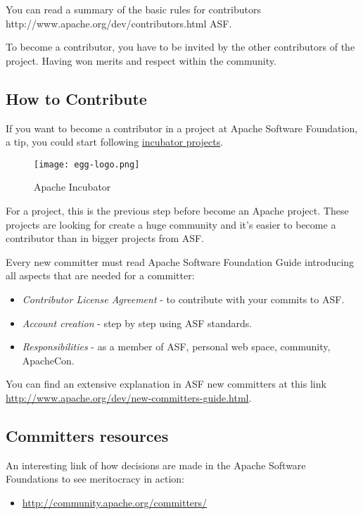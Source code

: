 \par You can read a summary of the basic rules for contributors http://www.apache.org/dev/contributors.html ASF.

\par To become a contributor, you have to be invited by the other contributors of the project. Having won merits and respect within the community.

\subsection{How to Contribute}

\par If you want to become a contributor in a project at Apache Software Foundation, a tip, you could start following \href{http://incubator.apache.org/}{incubator projects}.

\begin{figure}[htp]
    \centering
    \texttt{[image: egg-logo.png]}
    \caption{Apache Incubator}
    \label{egg-logo}
\end{figure}

\par For a project, this is the previous step before become an Apache project. These projects are looking for create a huge community and it's easier to become a contributor than in bigger projects from ASF.

\par Every new committer must read Apache Software Foundation Guide introducing all aspects that are needed for a committer:

\begin{itemize}
	\item \textit{Contributor License Agreement} - to contribute with your commits to ASF.
	\item \textit{Account creation} - step by step using ASF standards.
	\item \textit{Responsibilities} - as a member of ASF, personal web space, community, ApacheCon.
\end{itemize}  You can find an extensive explanation in ASF new committers at this link 
\url{http://www.apache.org/dev/new-committers-guide.html}.

\subsection{Committers resources}

\par An interesting link of how decisions are made in the Apache Software Foundations to see meritocracy in action:
\begin{itemize}
	\item \url{http://community.apache.org/committers/}
\end{itemize}

